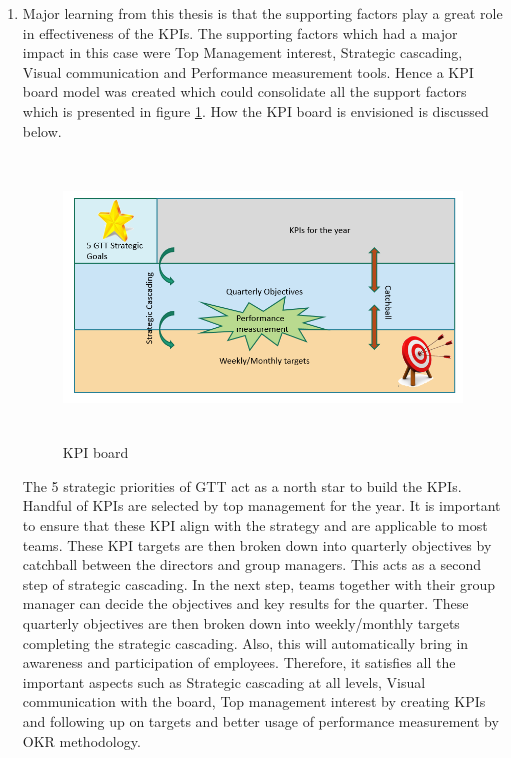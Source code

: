 \begin{enumerate}
    \item Major learning from this thesis is that the supporting factors play a great role in effectiveness of the KPIs. The supporting factors which had a major impact in this case were Top Management interest, Strategic cascading, Visual communication and Performance measurement tools. Hence a KPI board model was created which could consolidate all the support factors which is presented in figure \ref{fig:final}. How the KPI board is envisioned is discussed below.\\
    \begin{figure}[H]
    \centering
    \captionsetup{justification=centering, margin=2cm}
    \vspace{1cm}
    \includegraphics[width=13.5cm, height=7.5cm]{figure/auxiliary/final.PNG}
    \caption{KPI board}
    \label{fig:final}
\end{figure}
    
    The 5 strategic priorities of GTT act as a north star to build the KPIs. Handful of KPIs are selected by top management for the year. It is important to ensure that these KPI align with the strategy and are applicable to most teams. These KPI targets are then broken down into quarterly objectives by catchball between the directors and group managers. This acts as a second step of strategic cascading. In the next step, teams together with their group manager can decide the objectives and key results for the quarter. These quarterly objectives are then broken down into weekly/monthly targets completing the strategic cascading. Also, this will automatically bring in awareness and participation of employees. Therefore, it satisfies all the important aspects such as Strategic cascading at all levels, Visual communication with the board, Top management interest by creating KPIs and following up on targets and better usage of performance measurement by OKR methodology.\\


\end{enumerate}
